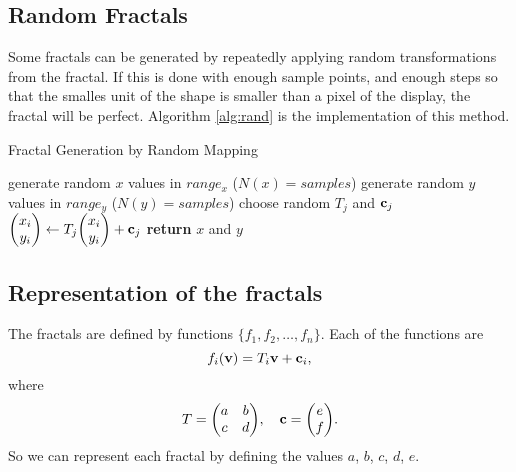 \documentclass[12pt,a4paper]{article}
\begin{document}
    \subsection{Random Fractals}
    Some fractals can be generated by repeatedly applying random transformations from the fractal. If this is done with enough
    sample points, and enough steps so that the smalles unit of the shape is smaller than a pixel of the display, the fractal
    will be perfect. Algorithm \ref{alg:rand} is the implementation of this method.
    \begin{algorithm}
        \caption{Fractal Generation by Random Mapping}
        \label{alg:rand}
        \begin{algorithmic}[1]
                \State generate random $x$ values in $range_x$ ($N(x)=samples$)
                \State generate random $y$ values in $range_y$ ($N(y)=samples$)
                        \State choose random $T_j$ and $\vb{c}_j$
                        \State $\mqty(x_i \\ y_i)\gets T_j\mqty(x_i \\ y_i) + \vb{c}_j$
                    \EndFor
                \EndFor
                \State \textbf{return} $x$ and $y$
            \EndFunction
        \end{algorithmic}
    \end{algorithm}
    \subsection{Representation of the fractals}
    The fractals are defined by functions $\{f_1, f_2, \dots, f_n\}$. Each of the functions are
    \begin{equation}
        f_i(\vb{v}) = T_i\vb{v} + \vb{c}_i,
    \end{equation}
    where
    \begin{gather}
        T = \mqty(a & b \\ c & d),\quad \vb{c} = \mqty(e \\ f).
    \end{gather}
    So we can represent each fractal by defining the values $a$, $b$, $c$, $d$, $e$.
\end{document}
